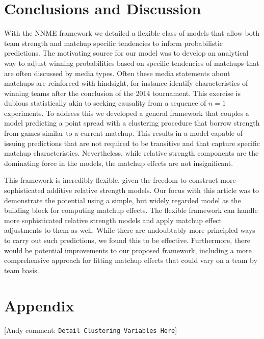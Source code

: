 \documentclass[letterpaper,12pt]{article}
\newcommand{\andyc}[1]{[{\color{red}\sc Andy comment: {\tt #1}}]}
\begin{document}
\section{Conclusions and Discussion}
With the NNME framework we detailed a flexible class of models that allow both team strength and matchup specific tendencies to inform probabilistic predictions. The motivating source for our model was to develop an analytical way to adjust winning probabilities based on specific tendencies of matchups that are often discussed by media types. Often these media statements about matchups are reinforced with hindsight, for instance identify characteristics of winning teams after the conclusion of the 2014 tournament. This exercise is dubious statistically akin to seeking causality from a sequence of $n=1$ experiments. To address this we developed a general framework that couples a model predicting a point spread with a clustering procedure that borrow strength from games similar to a current matchup. This results in a model capable of issuing predictions that are not required to be transitive and that capture specific matchup characteristics. Nevertheless, while relative strength components are the dominating force in the models, the matchup effects are not insignificant. 

This framework is incredibly flexible, given the freedom to construct more sophisticated additive relative strength models. Our focus with this article was to demonstrate the potential using a simple, but widely regarded model as the building block for computing matchup effects. The flexible framework can handle more sophisticated relative strength models and apply matchup effect adjustments to them as well. While there are undoubtably more principled ways to carry out such predictions, we found this to be effective. Furthermore, there would be potential improvements to our proposed framework, including a more comprehensive approach for fitting matchup effects that could vary on a team by team basis.


\section*{Appendix}
\andyc{Detail Clustering Variables Here}








\end{document}
